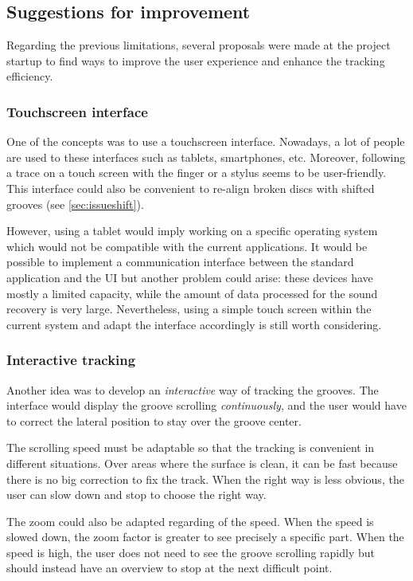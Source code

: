 \subsection{Suggestions for improvement}

Regarding the previous limitations, several proposals were made at the project startup to find ways to improve the user experience and enhance the tracking efficiency.

\subsubsection{Touchscreen interface}

One of the concepts was to use a touchscreen interface. Nowadays, a lot of people are used to these interfaces such as tablets, smartphones, etc. Moreover, following a trace on a touch screen with the finger or a stylus seems to be user-friendly. This interface could also be convenient to re-align broken discs with shifted grooves (see \autoref{sec:issueshift}).

However, using a tablet would imply working on a specific operating system which would not be compatible with the current applications. It would be possible to implement a communication interface between the standard application and the UI but another problem could arise: these devices have mostly a limited capacity, while the amount of data processed for the sound recovery is very large. Nevertheless, using a simple touch screen within the current system and adapt the interface accordingly is still worth considering.

\subsubsection{Interactive tracking}
\label{sec:inttrack}

Another idea was to develop an \emph{interactive} way of tracking the grooves. The interface would display the groove scrolling \emph{continuously}, and the user would have to correct the lateral position to stay over the groove center.

The scrolling speed must be adaptable so that the tracking is convenient in different situations. Over areas where the surface is clean, it can be fast because there is no big correction to fix the track. When the right way is less obvious, the user can slow down and stop to choose the right way.

The zoom could also be adapted regarding of the speed. When the speed is slowed down, the zoom factor is greater to see precisely a specific part. When the speed is high, the user does not need to see the groove scrolling rapidly but should instead have an overview to stop at the next difficult point.

